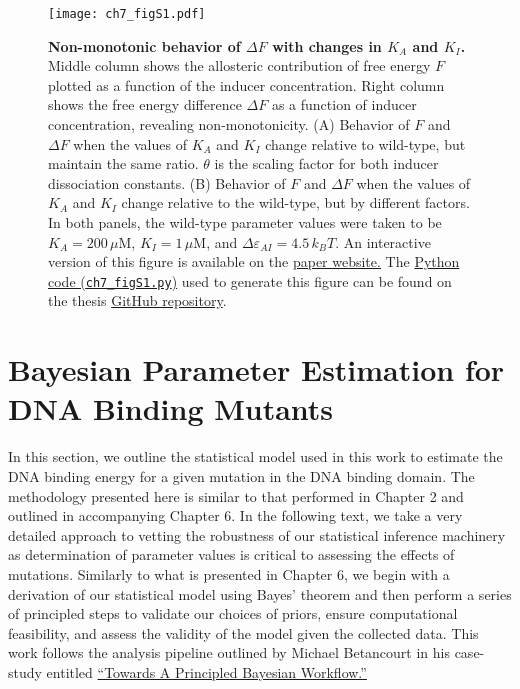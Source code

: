 \documentclass[12pt]{caltech_thesis}
\begin{document}
\hypertarget{fig:nonmono}{%
\begin{figure}
\centering
\texttt{[image: ch7\_figS1.pdf]}
\caption[{Non-monotonic behavior of \(\Delta F\) with changes in \(K_A\)
and \(K_I\).}]{\textbf{Non-monotonic behavior of \(\Delta F\) with
changes in \(K_A\) and \(K_I\).} Middle column shows the allosteric
contribution of free energy \(F\) plotted as a function of the inducer
concentration. Right column shows the free energy difference
\(\Delta F\) as a function of inducer concentration, revealing
non-monotonicity. (A) Behavior of \(F\) and \(\Delta F\) when the values
of \(K_A\) and \(K_I\) change relative to wild-type, but maintain the
same ratio. \(\theta\) is the scaling factor for both inducer
dissociation constants. (B) Behavior of \(F\) and \(\Delta F\) when the
values of \(K_A\) and \(K_I\) change relative to the wild-type, but by
different factors. In both panels, the wild-type parameter values were
taken to be \(K_A = 200\,\mu\)M, \(K_I = 1\,\mu\)M, and
\(\Delta\varepsilon_{AI} = 4.5\,k_BT\). An interactive version of this
figure is available on the
\href{http://rpgroup.caltech.edu/mwc_mutants}{paper website.} The
\href{https://github.com/gchure/phd/blob/master/src/chapter_07/code/ch7_figS1.py}{Python
code (\texttt{ch7\_figS1.py})} used to generate this figure can be found
on the thesis \href{https://github.com/gchure/phd}{GitHub repository}.}
\label{fig:nonmono}
\end{figure}
}

\hypertarget{bayesian-parameter-estimation-for-dna-binding-mutants}{%
\section{Bayesian Parameter Estimation for DNA Binding
Mutants}\label{bayesian-parameter-estimation-for-dna-binding-mutants}}

In this section, we outline the statistical model used in this work to
estimate the DNA binding energy for a given mutation in the DNA binding
domain. The methodology presented here is similar to that performed in
Chapter 2 and outlined in accompanying Chapter 6. In the following text,
we take a very detailed approach to vetting the robustness of our
statistical inference machinery as determination of parameter values is
critical to assessing the effects of mutations. Similarly to what is
presented in Chapter 6, we begin with a derivation of our statistical
model using Bayes' theorem and then perform a series of principled steps
to validate our choices of priors, ensure computational feasibility, and
assess the validity of the model given the collected data. This work
follows the analysis pipeline outlined by Michael Betancourt in his
case-study entitled
\href{https://betanalpha.github.io/assets/case_studies/principled_bayesian_workflow.html}{``Towards
A Principled Bayesian Workflow.''}
\end{document}
